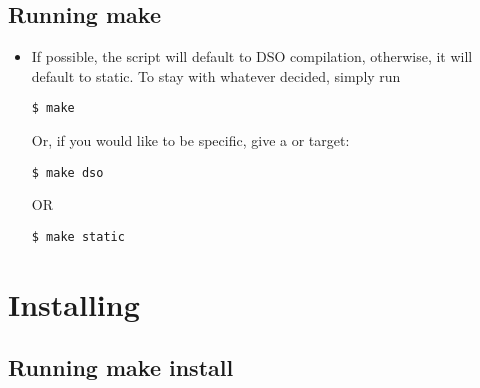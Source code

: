\subsection{Running make\label{inst-make}}

\begin{itemize}

\item
If possible, the  script will default to DSO
compilation, otherwise, it will default to static. To stay with
whatever  decided, simply run
\begin{verbatim}
$ make
\end{verbatim}


Or, if you would like to be specific, give  a
 or  target:
\begin{verbatim}
$ make dso
\end{verbatim}
OR
\begin{verbatim}
$ make static
\end{verbatim}

\end{itemize}

\section{Installing\label{inst-installing}}

\subsection{Running make install\label{inst-makeinstall}}

